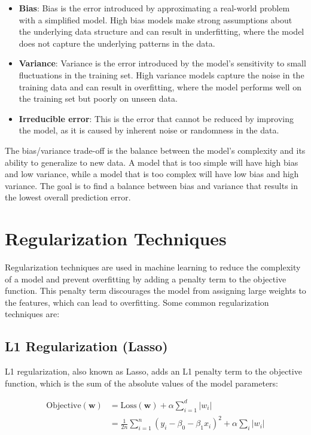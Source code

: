 \documentclass[12pt]{article}
\begin{document}
\begin{itemize}
\item \textbf{Bias}: Bias is the error introduced by approximating a real-world problem with a simplified model. High bias models make strong assumptions about the underlying data structure and can result in underfitting, where the model does not capture the underlying patterns in the data.
\item \textbf{Variance}: Variance is the error introduced by the model's sensitivity to small fluctuations in the training set. High variance models capture the noise in the training data and can result in overfitting, where the model performs well on the training set but poorly on unseen data.
\item \textbf{Irreducible error}: This is the error that cannot be reduced by improving the model, as it is caused by inherent noise or randomness in the data.
\end{itemize}
The bias/variance trade-off is the balance between the model's complexity and its ability to generalize to new data. A model that is too simple will have high bias and low variance, while a model that is too complex will have low bias and high variance. The goal is to find a balance between bias and variance that results in the lowest overall prediction error.

\section{Regularization Techniques}

Regularization techniques are used in machine learning to reduce the complexity of a model and prevent overfitting by adding a penalty term to the objective function. This penalty term discourages the model from assigning large weights to the features, which can lead to overfitting. Some common regularization techniques are:

\subsection{L1 Regularization (Lasso)}

L1 regularization, also known as Lasso, adds an L1 penalty term to the objective function, which is the sum of the absolute values of the model parameters:

\begin{align*}
	\text{Objective}(\boldsymbol{w}) &= \text{Loss}(\boldsymbol{w}) + \alpha \sum_{i=1}^{d} |w_i|\\
	&= \frac{1}{2n} \sum_{i=1}^n (y_i - \beta_0 - \beta_1 x_i)^2 + \alpha \sum_i |w_i|
\end{align*}
\end{document}
